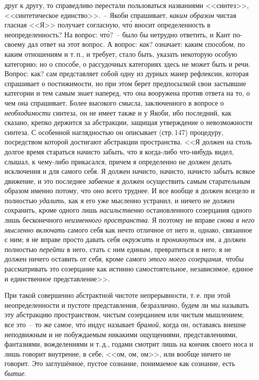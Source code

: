 друг к другу, то справедливо перестали пользоваться названиями
<<синтез>>, <<синтетическое единство>>.~-- Якоби
спрашивает, \emph{каким образом} чистая гласная <<Я>> получает
согласную, чт\'о вносит определенность в неопределенность?
На вопрос: чт\'о?~-- было бы нетрудно ответить, и
Кант по-своему дал ответ на этот вопрос. А вопрос: \emph{как}?
означает: каким способом, по каким отношениям и т.\,п.,
и требует, стало быть, указать некоторую особую категорию;
но о способе, о рассудочных категориях здесь не может
быть и речи. Вопрос: как? сам представляет собой
одну из дурных манер рефлексии, которая спрашивает о
постижимости, но при этом берет предпосылкой свои застывшие
категории и тем самым знает наперед, что она
вооружена против ответа на то, о чем она спрашивает.
Более высокого смысла, заключенного в вопросе о \emph{необходимости}
синтеза, он не имеет также и у Якоби, ибо
последний, как сказано, крепко держится за абстракции,
защищая утверждение о невозможности синтеза. С особенной
наглядностью он описывает (стр.\,147) процедуру,
посредством которой достигают абстракции пространства.
<<Я должен на столь долгое время стараться начисто забыть,
что я когда-либо что-нибудь видел, слышал, к чему-либо
прикасался, причем я определенно не должен
делать исключения и для самого себя. Я должен начисто,
начисто, начисто забыть всякое движение, и это последнее
\emph{забвение} я должен осуществить самым старательным образом
именно потому, что оно всего труднее. И все вообще
я должен всецело и полностью \emph{удалить}, как я его уже
мысленно устранил, и ничего не должен сохранить, кроме
одного лишь \emph{насильственно} остановленного созерцания
одного лишь бесконечного \emph{неизменного пространства}.
Я поэтому не вправе \emph{снова в него мысленно включать} самого
себя как нечто отличное от него и, однако, связанное
с ним; я не вправе просто давать себя \emph{окружить} и
\emph{проникнуться} им, а должен полностью \emph{перейти} в него,
стать с ним единым, превратиться в него; я не должен
ничего оставить от себя, кроме самого \emph{этого моего созерцания},
чтобы рассматривать это созерцание как истинно
самостоятельное, независимое, единое и единственное
представление>>.

При такой совершенно абстрактной чистоте непрерывности,
т.\,е. при этой неопределенности и пустоте представления,
безразлично, будем ли мы называть эту абстракцию
пространством, чистым созерцанием или чистым
мышлением; все это~-- то же самое, чт\'о индус называет
\emph{брамой}, когда он, оставаясь внешне неподвижным и не
побуждаемым никакими ощущениями, представлениями,
фантазиями, вожделениями и т.\,д., годами смотрит лишь
на кончик своего носа и лишь говорит внутренне, в себе,
<<ом, ом, ом>>, или вообще ничего не говорит. Это заглушённое,
пустое сознание, понимаемое как сознание, есть
\emph{бытие}.

